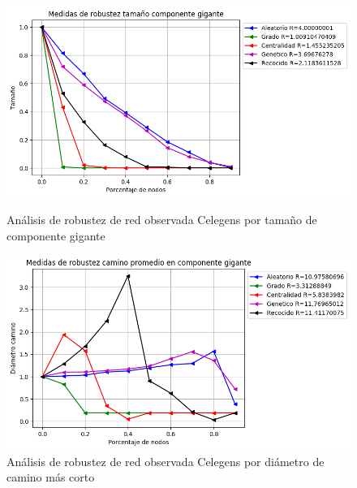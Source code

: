 \begin{figure}[!htb]
    \begin{minipage}{0.48\textwidth}
        \centering
        \includegraphics[scale=0.4]{CapituloAAnexos/imagenesAnexoC/Robustez/grafica_GC20180508_020345Celengs}
        \caption{Análisis de robustez de red observada Celegens por tamaño de componente gigante}
    \end{minipage}\hfill
   \begin{minipage}{0.48\textwidth}
         \centering
       \includegraphics[scale=0.4]{CapituloAAnexos/imagenesAnexoC/Robustez/grafica_APL20180508_020345Celengs}
        \caption{Análisis de robustez de red observada Celegens por diámetro de camino más corto}
    \end{minipage}
\end{figure}

